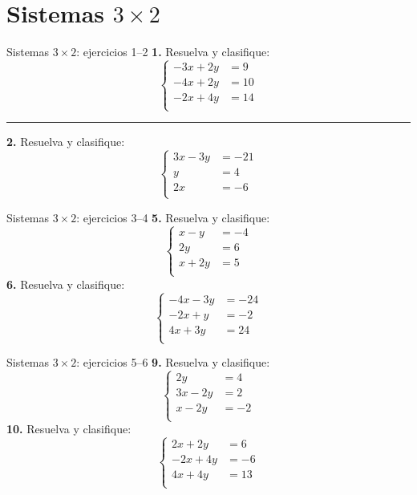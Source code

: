 \documentclass[aspectratio=169]{beamer}
\begin{document}
\section{Sistemas $3\times 2$}
\begin{frame}{Sistemas $3\times 2$: ejercicios 1--2}
\small
\textbf{1.} Resuelva y clasifique:
\[\left\{\begin{aligned}
-3x+2y&=9\\
-4x+2y&=10\\
-2x+4y&=14\\
\end{aligned}\right.\]
\vspace{0.2em}\hrule\vspace{0.3em}
\textbf{2.} Resuelva y clasifique:
\[\left\{\begin{aligned}
3x-3y&=-21\\
y&=4\\
2x&=-6\\
\end{aligned}\right.\]
\end{frame}
\begin{frame}{Sistemas $3\times 2$: ejercicios 3--4}
\small
\textbf{5.} Resuelva y clasifique:
\[\left\{\begin{aligned}
x-y&=-4\\
2y&=6\\
x+2y&=5\\
\end{aligned}\right.\]
\textbf{6.} Resuelva y clasifique:
\[\left\{\begin{aligned}
-4x-3y&=-24\\
-2x+y&=-2\\
4x+3y&=24\\
\end{aligned}\right.\]
\end{frame}
\begin{frame}{Sistemas $3\times 2$: ejercicios 5--6}
\small
\textbf{9.} Resuelva y clasifique:
\[\left\{\begin{aligned}
2y&=4\\
3x-2y&=2\\
x-2y&=-2\\
\end{aligned}\right.\]
\textbf{10.} Resuelva y clasifique:
\[\left\{\begin{aligned}
2x+2y&=6\\
-2x+4y&=-6\\
4x+4y&=13\\
\end{aligned}\right.\]
\end{frame}
\end{document}
